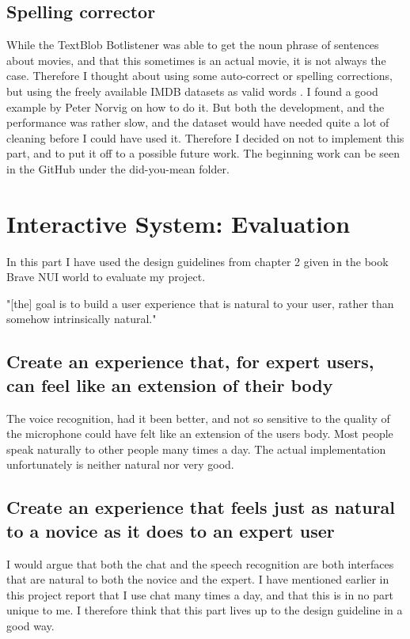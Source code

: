 \documentclass[11pt,fleqn]{book} %
\begin{document}
\section{Spelling corrector}
While the TextBlob Botlistener was able to get the noun phrase\cite{WikipediaNounPhrase} of sentences about movies, and that this sometimes is an actual movie, it is not always the case. Therefore I thought about using some auto-correct or spelling corrections, but using the freely available IMDB datasets as valid words \cite{IMDbAlternativeInterfaces}. I found a good example by Peter Norvig \cite{NorvigHowCorrector} on how to do it.
But both the development, and the performance was rather slow, and the dataset would have needed quite a lot of cleaning before I could have used it. Therefore I decided on not to implement this part, and to put it off to a possible future work. The beginning work can be seen in the GitHub\cite{Github2017GitHubProject} under the did-you-mean folder.


\chapter{Interactive System: Evaluation}
In this part I have used the design guidelines from chapter 2 given in the book Brave NUI\cite{Wigdor2010BraveWorld} world to evaluate my project.

"[the] goal is to build a user experience
that is natural to your user, rather than somehow intrinsically natural\cite{Wigdor2010BraveWorld}."

\section{Create an experience that, for expert users, can feel like an extension of their
body}
The voice recognition, had it been better, and not so sensitive to the quality of the microphone could have felt like an extension of the users body. Most people speak naturally to other people many times a day. The actual implementation unfortunately is neither natural nor very good.

\section{Create an experience that feels just as natural to a novice as it does to an
expert user}
I would argue that both the chat and the speech recognition are both interfaces that are natural to both the novice and the expert. I have mentioned earlier in this project report that I use chat many times a day, and that this is in no part unique to me. I therefore think that this part lives up to the design guideline in a good way.
\end{document}
